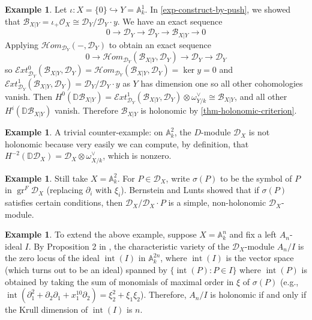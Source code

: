 \documentclass[11pt, a4paper]{article}
\theoremstyle{definition}
\newtheorem{example}[theorem]{Example}
\newcommand{\gr}{\operatorname{gr}}
\newcommand{\w}[0]{\omega}
\newcommand{\s}[0]{\sigma}
\newcommand{\A}[0]{\mathbb{A}}
\begin{document}
    \begin{example}
        Let $\iota:X=\{0\}\hookrightarrow Y=\mathbb A_k^1$. In \cref{exp-construct-by-push}, we showed that $\mathcal B_{X|Y}=\iota_+\mathcal O_X\cong\mathcal D_Y/\mathcal D_Y\cdot y$. We have an exact sequence
        \[0\to\mathcal D_Y\to\mathcal D_Y\to\mathcal B_{X|Y}\to 0\]
        Applying $\mathcal Hom_{\mathcal D_Y}(-,\mathcal D_Y)$ to obtain an exact sequence
        \[0\to\mathcal Hom_{\mathcal D_Y}(\mathcal B_{X|Y},\mathcal D_Y)\to\mathcal D_Y\to\mathcal D_Y\]
        so $\mathcal Ext^0_{\mathcal D_Y}(\mathcal B_{X|Y},\mathcal D_Y)=\mathcal Hom_{\mathcal D_Y}(\mathcal B_{X|Y},\mathcal D_Y)=\ker y=0$ and $\mathcal Ext^1_{\mathcal D_Y}(\mathcal B_{X|Y},\mathcal D_Y)=\mathcal D_Y/\mathcal D_Y\cdot y$ as $Y$ has dimension one so all other cohomologies vanish. Then $H^0(\mathbb D\mathcal B_{X|Y})=\mathcal Ext^1_{\mathcal D_Y}(\mathcal B_{X|Y},\mathcal D_Y)\otimes\w_{Y/k}^\vee\cong\mathcal B_{X|Y}$, and all other $H^i(\mathbb D\mathcal B_{X|Y})$ vanish. Therefore $\mathcal B_{X|Y}$ is holonomic by \cref{thm-holonomic-criterion}.
    \end{example}
    \begin{example}\label{exp-not-holo-1}
        A trivial counter-example: on $\mathbb A_k^2$, the $D$-module $\mathcal D_X$ is not holonomic because very easily we can compute, by definition, that $H^{-2}(\mathbb D\mathcal D_X)=\mathcal D_X\otimes\w_{X/k}^\vee$, which is nonzero.
    \end{example}
    \begin{example}
        Still take $X=\mathbb A_k^2$. For $P\in\mathcal D_X$, write $\s(P)$ to be the symbol of $P$ in $\gr^F\mathcal D_X$ (replacing $\partial_i$ with $\xi_i$). Bernstein and Lunts showed that if $\s(P)$ satisfies certain conditions, then $\mathcal D_X/\mathcal D_X\cdot P$ is a simple, non-holonomic $\mathcal D_X$-module.
    \end{example}
    \begin{example}
        To extend the above example, suppose $X=\A^n_k$ and fix a left $A_n$-ideal $I$. By Proposition 2 in \cite{oaku-computational}, the characteristic variety of the $\mathcal D_X$-module $A_n/I$ is the zero locus of the ideal $\operatorname{int}(I)$ in $\A^{2n}_k$, where $\operatorname{int}(I)$ is the vector space (which turns out to be an ideal) spanned by $\{\operatorname{int}(P):P\in I\}$ where $\operatorname{int}(P)$ is obtained by taking the sum of monomials of maximal order in $\xi$ of $\s(P)$ (e.g., $\operatorname{int}(\partial_1^2+\partial_2\partial_1+x_1^{10}\partial_2)=\xi_2^2+\xi_1\xi_2$). Therefore, $A_n/I$ is holonomic if and only if the Krull dimension of $\operatorname{int}(I)$ is $n$.
    \end{example}
\end{document}
